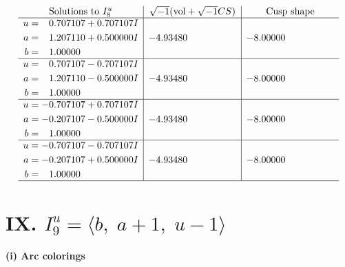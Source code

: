\documentclass[1p]{elsarticle_modified}
\theoremstyle{definition}
\newcommand{\I}{\sqrt{-1}}
\begin{document}
$$\begin{array}{c|c|c}  
\text{Solutions to }I^u_{8}& \I (\text{vol} + \sqrt{-1}CS) & \text{Cusp shape}\\
 \hline 
\begin{aligned}
u &= \phantom{-}0.707107 + 0.707107 I \\
a &= \phantom{-}1.207110 + 0.500000 I \\
b &= \phantom{-}1.00000\phantom{ +0.000000I}\end{aligned}
 & -4.93480\phantom{ +0.000000I} & -8.00000\phantom{ +0.000000I} \\ \hline\begin{aligned}
u &= \phantom{-}0.707107 - 0.707107 I \\
a &= \phantom{-}1.207110 - 0.500000 I \\
b &= \phantom{-}1.00000\phantom{ +0.000000I}\end{aligned}
 & -4.93480\phantom{ +0.000000I} & -8.00000\phantom{ +0.000000I} \\ \hline\begin{aligned}
u &= -0.707107 + 0.707107 I \\
a &= -0.207107 - 0.500000 I \\
b &= \phantom{-}1.00000\phantom{ +0.000000I}\end{aligned}
 & -4.93480\phantom{ +0.000000I} & -8.00000\phantom{ +0.000000I} \\ \hline\begin{aligned}
u &= -0.707107 - 0.707107 I \\
a &= -0.207107 + 0.500000 I \\
b &= \phantom{-}1.00000\phantom{ +0.000000I}\end{aligned}
 & -4.93480\phantom{ +0.000000I} & -8.00000\phantom{ +0.000000I}\\
 \hline 
 \end{array}$$\newpage\newpage\renewcommand{\arraystretch}{1}
\centering \section*{IX. $I^u_{9}= \langle b,\;a+1,\;u-1 \rangle$}
\flushleft \textbf{(i) Arc colorings}\\
\end{document}
